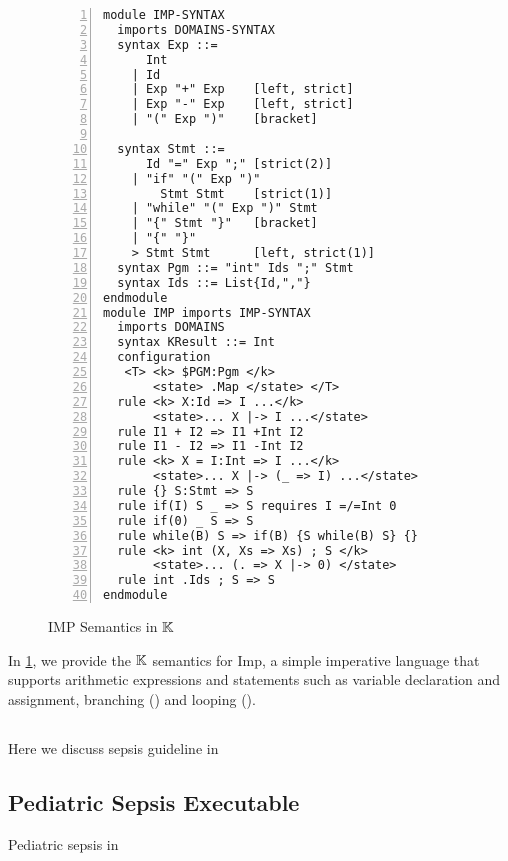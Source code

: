 \begin{figure}[H]
  \centering
  \begin{lstlisting}[style=ksty, language=k,  multicols=2,
  basicstyle=\ttfamily\scriptsize, numbers=left
  ,framexleftmargin=1.5em
  ,showspaces=false
  ,xleftmargin=2em]
module IMP-SYNTAX
  imports DOMAINS-SYNTAX
  syntax Exp ::=
      Int
    | Id
    | Exp "+" Exp    [left, strict]
    | Exp "-" Exp    [left, strict]
    | "(" Exp ")"    [bracket]

  syntax Stmt ::=
      Id "=" Exp ";" [strict(2)]
    | "if" "(" Exp ")"
        Stmt Stmt    [strict(1)]
    | "while" "(" Exp ")" Stmt
    | "{" Stmt "}"   [bracket]
    | "{" "}"
    > Stmt Stmt      [left, strict(1)]
  syntax Pgm ::= "int" Ids ";" Stmt
  syntax Ids ::= List{Id,","}
endmodule
module IMP imports IMP-SYNTAX
  imports DOMAINS
  syntax KResult ::= Int
  configuration
   <T> <k> $PGM:Pgm </k>
       <state> .Map </state> </T>
  rule <k> X:Id => I ...</k>
       <state>... X |-> I ...</state>
  rule I1 + I2 => I1 +Int I2
  rule I1 - I2 => I1 -Int I2
  rule <k> X = I:Int => I ...</k>
       <state>... X |-> (_ => I) ...</state>
  rule {} S:Stmt => S
  rule if(I) S _ => S requires I =/=Int 0
  rule if(0) _ S => S
  rule while(B) S => if(B) {S while(B) S} {}
  rule <k> int (X, Xs => Xs) ; S </k>
       <state>... (. => X |-> 0) </state>
  rule int .Ids ; S => S
endmodule
\end{lstlisting}
  \caption{IMP Semantics in $\mathbb{K}$}\label{fig:imp-semantics}
\end{figure}

In \figurename{} \ref{fig:imp-semantics}, we provide the $\mathbb{K}$ semantics
for Imp, a simple imperative language that supports arithmetic expressions and
statements such as variable declaration and assignment, branching () and looping ().

\subsection{\MediK{}}\label{subsec:medik}
Here we discuss sepsis guideline in \MediK{}


\subsection{Pediatric Sepsis Executable \BPG{}}\label{subsec:sepsis-cdss}
Pediatric sepsis \CDSS{} in \MediK{}


